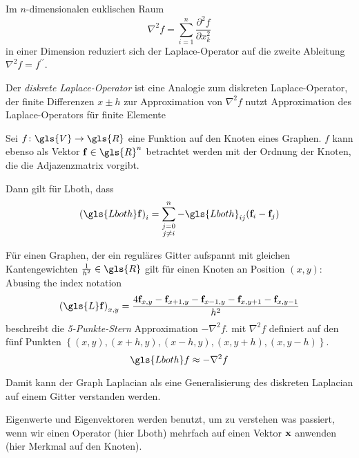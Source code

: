 Im $n$-dimensionalen euklischen Raum
\begin{equation}
  \nabla^2f = \sum_{i=1}^n \frac{\partial^2f}{\partial x^2_k}
\end{equation}
in einer Dimension reduziert sich der Laplace-Operator auf die zweite Ableitung $\nabla^2 f = f^{\prime\prime}$.

Der \emph{diskrete Laplace-Operator} ist eine Analogie zum diskreten Laplace-Operator, der finite Differenzen $x \pm h$ zur Approximation von $\nabla^2 f$ nutzt
 Approximation des Laplace-Operators für finite Elemente

Sei $f \colon \gls{V} \to \gls{R}$ eine Funktion auf den Knoten eines Graphen.
$f$ kann ebenso als Vektor $\ve{f} \in \gls{R}^n$ betrachtet werden mit der Ordnung der Knoten, die die Adjazenzmatrix vorgibt.

Dann gilt für \gls{Lboth}, dass
\begin{equation}
  {\left(\gls{Lboth}\ve{f}\right)}_i = \sum^n_{\substack{j=0\\j \neq i}} -\gls{Lboth}_{ij} \left(\ve{f}_i - \ve{f}_j\right)
\end{equation}

Für einen Graphen, der ein reguläres Gitter aufspannt mit gleichen Kantengewichten $\frac{1}{h^2} \in \gls{R}$ gilt für einen Knoten an Position $\left(x, y\right)$:
Abusing the index notation
\begin{equation}
  {\left(\gls{L}\ve{f}\right)}_{x,y} = \frac{4\ve{f}_{x,y} - \ve{f}_{x+1,y} - \ve{f}_{x-1,y} - \ve{f}_{x,y+1} - \ve{f}_{x,y-1}}{h^2}
\end{equation}
beschreibt die \emph{5-Punkte-Stern} Approximation $-\nabla^2 f$.
mit $\nabla^2 f$ definiert auf den fünf Punkten $\left\{\left(x,y\right), \left(x+h,y\right), \left(x-h,y\right), \left(x,y+h\right),\left(x,y-h\right)\right\}$.
\begin{equation}
  \gls{Lboth}f \approx - \nabla^2 f
\end{equation}


Damit kann der Graph Laplacian als eine Generalisierung des diskreten Laplacian auf einem Gitter verstanden werden.

Eigenwerte und Eigenvektoren werden benutzt, um zu verstehen was passiert, wenn wir einen Operator (hier \gls{Lboth}) mehrfach auf einen Vektor $\mathbf{x}$ anwenden (hier Merkmal auf den Knoten).


